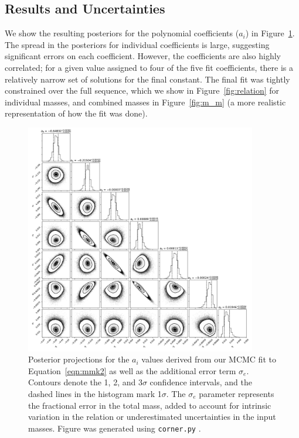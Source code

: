 \documentclass[twocolumn]{aastex62}
\begin{document}
\subsection{Results and Uncertainties}\label{sec:res}

We show the resulting posteriors for the polynomial coefficients ($a_i$) in Figure~\ref{fig:fitpost}. The spread in the posteriors for individual coefficients is large, suggesting significant errors on each coefficient. However, the coefficients are also highly correlated; for a given value assigned to four of the five fit coefficients, there is a relatively narrow set of solutions for the final constant. The final fit was tightly constrained over the full sequence, which we show in Figure~\ref{fig:relation} for individual masses, and combined masses in Figure~\ref{fig:m_m} (a more realistic representation of how the fit was done). 

\begin{figure}[p]
\begin{center}
\includegraphics[width=0.9\textwidth]{output_7_eMs.pdf}
\caption{Posterior projections for the $a_i$ values derived from our MCMC fit to Equation~\ref{eqn:mmk2} as well as the additional error term $\sigma_e$. Contours denote the 1, 2, and 3$\sigma$ confidence intervals, and the dashed lines in the histogram mark 1$\sigma$. The $\sigma_e$ parameter represents the fractional error in the total mass, added to account for intrinsic variation in the relation or underestimated uncertainties in the input masses. Figure was generated using {\tt corner.py} \citep{corner}.}
\label{fig:fitpost}
\end{center}
\end{figure}
\end{document}
